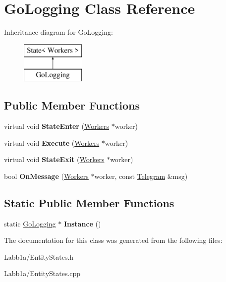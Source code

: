 \hypertarget{class_go_logging}{}\section{Go\+Logging Class Reference}
\label{class_go_logging}
Inheritance diagram for Go\+Logging\+:\begin{figure}[H]
\begin{center}
\leavevmode
\includegraphics[height=2.000000cm]{class_go_logging}
\end{center}
\end{figure}
\subsection*{Public Member Functions}
\begin{DoxyCompactItemize}
\item 
\hypertarget{class_go_logging_a073579651326fd31ed6a200778bb86f9}{}virtual void {\bfseries State\+Enter} (\hyperlink{class_workers}{Workers} $\ast$worker)\label{class_go_logging_a073579651326fd31ed6a200778bb86f9}

\item 
\hypertarget{class_go_logging_acedd11be0dddff0176fdf91296567af6}{}virtual void {\bfseries Execute} (\hyperlink{class_workers}{Workers} $\ast$worker)\label{class_go_logging_acedd11be0dddff0176fdf91296567af6}

\item 
\hypertarget{class_go_logging_a44a839d51095a5f1266695f9cb6af35c}{}virtual void {\bfseries State\+Exit} (\hyperlink{class_workers}{Workers} $\ast$worker)\label{class_go_logging_a44a839d51095a5f1266695f9cb6af35c}

\item 
\hypertarget{class_go_logging_ac04459d45c836a6d95b01c95011494bc}{}bool {\bfseries On\+Message} (\hyperlink{class_workers}{Workers} $\ast$worker, const \hyperlink{struct_telegram}{Telegram} \&msg)\label{class_go_logging_ac04459d45c836a6d95b01c95011494bc}

\end{DoxyCompactItemize}
\subsection*{Static Public Member Functions}
\begin{DoxyCompactItemize}
\item 
\hypertarget{class_go_logging_a8fd8d4e719045323fc359870e930141d}{}static \hyperlink{class_go_logging}{Go\+Logging} $\ast$ {\bfseries Instance} ()\label{class_go_logging_a8fd8d4e719045323fc359870e930141d}

\end{DoxyCompactItemize}


The documentation for this class was generated from the following files\+:\begin{DoxyCompactItemize}
\item 
Labb1a/Entity\+States.\+h\item 
Labb1a/Entity\+States.\+cpp\end{DoxyCompactItemize}
